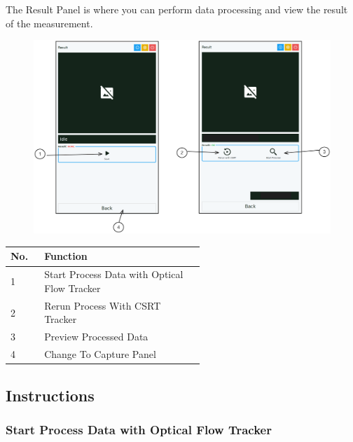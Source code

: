 The Result Panel is where you can perform data processing and view the result of the measurement.

\begin{figure}[H]
    \centering
    \includegraphics[width=\textwidth]{texs/chapter1/image/p5.png}
\end{figure}

\begin{table}[!ht]
    \centering
    \begin{tabular}{p{0.05\linewidth} | p{0.5\linewidth}}
        \hline
        \textbf{No.} & \textbf{Function}                            \\ \hline
        1            & Start Process Data with Optical Flow Tracker \\ \hline
        2            & Rerun Process With CSRT Tracker              \\ \hline
        3            & Preview Processed Data                       \\ \hline
        4            & Change To Capture Panel                      \\ \hline
    \end{tabular}
\end{table}

\subsection{Instructions}

\subsubsection{Start Process Data with Optical Flow Tracker}

